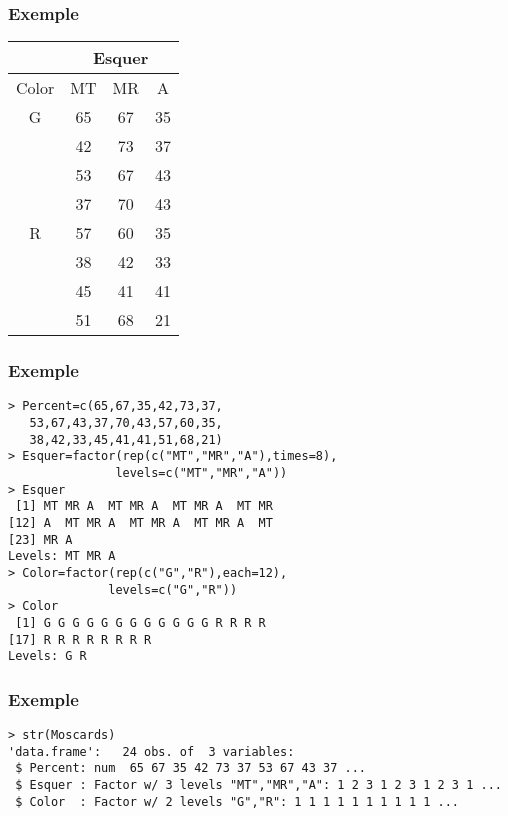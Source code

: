 \documentclass[12pt,t]{beamer}
\theoremstyle{plain}
\theoremstyle{definition}
\begin{document}
\begin{frame}
\frametitle{Exemple} 

\begin{center}
\begin{tabular}{cccc}\hline
\multicolumn{1}{c}{ }&\multicolumn{3}{c}{Esquer}\\\hline
\multicolumn{1}{c}{Color} & \multicolumn{1}{c}{MT}&  \multicolumn{1}{c}{MR} & \multicolumn{1}{c}{A}  \\\hline
G &65 &  67 &  35   \\
&42& 73& 37 \\
& 53  & 67 &  43 \\
&37&  70&   43 \\\hline
R & 57  & 60& 35  \\
 & 38& 42& 33\\
 &45 & 41& 41 \\
 & 51& 68&  21 \\\hline
 \end{tabular}
\end{center}

\end{frame}





\begin{frame}[fragile]
\frametitle{Exemple} 

\begin{lstlisting}
> Percent=c(65,67,35,42,73,37,
   53,67,43,37,70,43,57,60,35,
   38,42,33,45,41,41,51,68,21)
> Esquer=factor(rep(c("MT","MR","A"),times=8),
               levels=c("MT","MR","A"))
> Esquer
 [1] MT MR A  MT MR A  MT MR A  MT MR
[12] A  MT MR A  MT MR A  MT MR A  MT
[23] MR A 
Levels: MT MR A
> Color=factor(rep(c("G","R"),each=12),
              levels=c("G","R"))
> Color
 [1] G G G G G G G G G G G G R R R R
[17] R R R R R R R R
Levels: G R
\end{lstlisting}


\end{frame}



\begin{frame}[fragile]
\frametitle{Exemple} 


\begin{lstlisting}
> str(Moscards)
'data.frame':	24 obs. of  3 variables:
 $ Percent: num  65 67 35 42 73 37 53 67 43 37 ...
 $ Esquer : Factor w/ 3 levels "MT","MR","A": 1 2 3 1 2 3 1 2 3 1 ...
 $ Color  : Factor w/ 2 levels "G","R": 1 1 1 1 1 1 1 1 1 1 ...
\end{lstlisting}
\end{frame}
\end{document}

